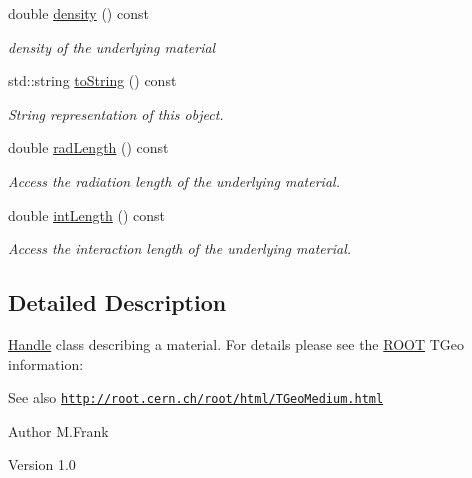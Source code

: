 \begin{DoxyCompactItemize}
double \hyperlink{class_d_d4hep_1_1_geometry_1_1_material_a94f0e36daf1dcc1b3d48f8cf619956cd}{density} () const 
\begin{DoxyCompactList}\small\item\em density of the underlying material \item\end{DoxyCompactList}\item 
std::string \hyperlink{class_d_d4hep_1_1_geometry_1_1_material_a32830223c2b3fa117acc466e61920cb2}{toString} () const 
\begin{DoxyCompactList}\small\item\em String representation of this object. \item\end{DoxyCompactList}\item 
double \hyperlink{class_d_d4hep_1_1_geometry_1_1_material_aa7f0b0fb59030760048149b4bb1e28d2}{radLength} () const 
\begin{DoxyCompactList}\small\item\em Access the radiation length of the underlying material. \item\end{DoxyCompactList}\item 
double \hyperlink{class_d_d4hep_1_1_geometry_1_1_material_a85556105aefacd4e33ca9c8157652e0f}{intLength} () const 
\begin{DoxyCompactList}\small\item\em Access the interaction length of the underlying material. \item\end{DoxyCompactList}\end{DoxyCompactItemize}


\subsection{Detailed Description}
\hyperlink{class_d_d4hep_1_1_handle}{Handle} class describing a material. For details please see the \hyperlink{namespace_r_o_o_t}{ROOT} TGeo information: \begin{DoxySeeAlso}{See also}
\href{http://root.cern.ch/root/html/TGeoMedium.html}{\tt http://root.cern.ch/root/html/TGeoMedium.html}
\end{DoxySeeAlso}
\begin{DoxyAuthor}{Author}
M.Frank 
\end{DoxyAuthor}
\begin{DoxyVersion}{Version}
1.0 
\end{DoxyVersion}


